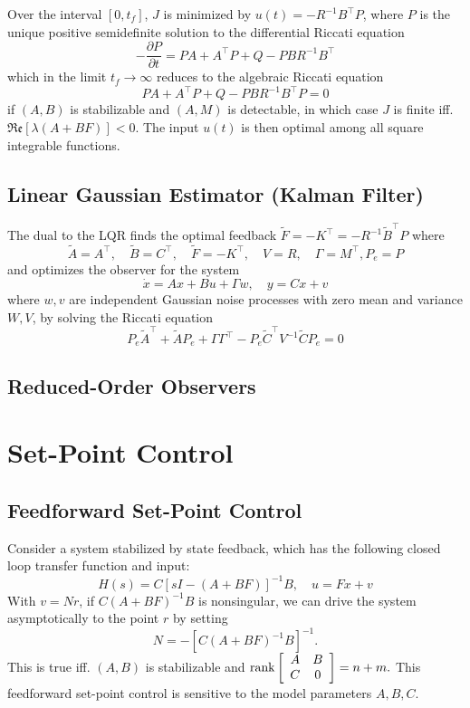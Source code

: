 \documentclass{article}
\begin{document}
Over the interval $[0, t_f]$, $J$ is minimized by
$u(t) = -R^{-1} B^\top P$, where $P$ is the unique
positive semidefinite solution to the
differential Riccati equation
$$
-\frac{\partial P}{\partial t} =
P A + A^\top P + Q - P B R^{-1} B^\top
$$
which in the limit $t_f \to \infty$ reduces to the algebraic Riccati
equation
$$
P A + A^\top P + Q - P B R^{-1} B^\top P = 0
$$
if $(A, B)$ is stabilizable and $(A, M)$ is detectable, in which case
$J$ is finite iff. $\mathfrak{Re}[\lambda(A + BF)] < 0$. The input
$u(t)$ is then optimal among all square integrable functions.

\subsection{Linear Gaussian Estimator (Kalman Filter)}
The dual to the LQR finds the optimal feedback
$\tilde{F} =- K^\top = -R^{-1} \tilde{B}^\top P$ where
$$
\tilde{A} = A^\top, \quad
\tilde{B} = C^\top, \quad
\tilde{F} = -K^\top, \quad
V = R, \quad
\Gamma = M^\top,
P_e = P
$$
and optimizes the observer for the system
$$
\dot{x} = A x + B u + \Gamma w, \quad
y = C x + v
$$
where $w, v$ are independent Gaussian noise processes with zero mean
and variance $W, V$, by solving the Riccati equation
$$
  P_e \tilde{A}^\top
+ \tilde{A} P_e
+ \Gamma \Gamma^\top
- P_e \tilde{C}^\top V^{-1} \tilde{C} P_e
= 0
$$

\subsection{Reduced-Order Observers}

\section{Set-Point Control}

\subsection{Feedforward Set-Point Control}
Consider a system stabilized by state feedback, which has the
following closed loop transfer function and input:
$$
H(s) = C[sI - (A + BF)]^{-1} B, \quad
u = F x + v
$$
With $v = N r$, if $C(A + BF)^{-1}B$ is nonsingular, we can drive the
system asymptotically to the point $r$ by setting
$$
N = -[C(A + BF)^{-1} B]^{-1}.
$$
This is true iff. $(A, B)$ is stabilizable and
$
\mathrm{rank}
\left[\begin{array}{c c}
  A & B \\
  C & 0
\end{array}\right] = n + m.
$
This feedforward set-point control is sensitive to the model
parameters $A, B, C$.
\end{document}
